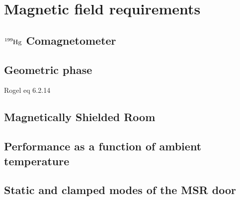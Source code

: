 
\section
{
    Magnetic field requirements\label{sec:magnetic_field_req}
}



\subsection
{
    \texorpdfstring{$\ce{^{199}Hg}$ Comagnetometer}
                    {199Hg Comagnetometer}\label{sec:199hg_comag}
}



\subsection{Geometric phase}


Rogel eq 6.2.14


\subsection{Magnetically Shielded Room}



\subsection{Performance as a function of ambient temperature}




\subsection{Static and clamped modes of the MSR door}

